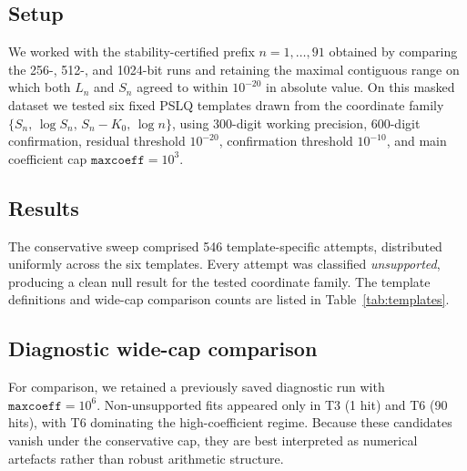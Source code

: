\documentclass[11pt]{amsart}
\begin{document}
\subsection{Setup}
We worked with the stability-certified prefix $n=1,\ldots,91$ obtained by comparing the 256-, 512-, and 1024-bit runs and retaining the maximal contiguous range on which both $L_n$ and $S_n$ agreed to within $10^{-20}$ in absolute value. On this masked dataset we tested six fixed PSLQ templates drawn from the coordinate family $\{S_n,\, \log S_n,\, S_n-K_0,\, \log n\}$, using 300-digit working precision, 600-digit confirmation, residual threshold $10^{-20}$, confirmation threshold $10^{-10}$, and main coefficient cap $\texttt{maxcoeff}=10^3$.

\subsection{Results}
The conservative sweep comprised 546 template-specific attempts, distributed uniformly across the six templates. Every attempt was classified \emph{unsupported}, producing a clean null result for the tested coordinate family. The template definitions and wide-cap comparison counts are listed in Table~\ref{tab:templates}.



\subsection{Diagnostic wide-cap comparison}\label{sec:widecap}
For comparison, we retained a previously saved diagnostic run with $\texttt{maxcoeff}=10^6$. Non-unsupported fits appeared only in T3 (1 hit) and T6 (90 hits), with T6 dominating the high-coefficient regime. Because these candidates vanish under the conservative cap, they are best interpreted as numerical artefacts rather than robust arithmetic structure.
\end{document}
